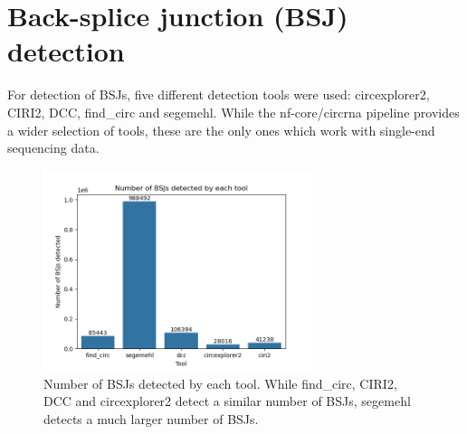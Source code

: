 \section{Back-splice junction (BSJ) detection}

For detection of BSJs, five different detection tools were used: circexplorer2,
CIRI2, DCC, find\_circ and segemehl.
While the nf-core/circrna pipeline provides a wider selection of tools, these
are the only ones which work with single-end sequencing data.

\begin{figure}[ht]
    \centering

    \includegraphics[width=0.7\textwidth]{chapters/4_results_and_discussion/figures/detection/n_bsjs_detected.png}
    \caption{Number of BSJs detected by each tool.
        While find\_circ, CIRI2, DCC and circexplorer2 detect a similar number of
        BSJs, segemehl detects a much larger number of BSJs.
    }
    \label{fig:detection_bars}
\end{figure}

